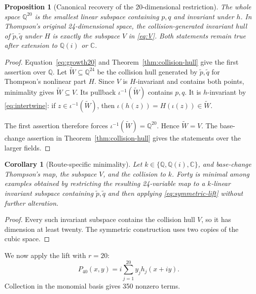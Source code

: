 \documentclass[11pt]{article}
\newtheorem{proposition}[theorem]{Proposition}
\newtheorem{corollary}[theorem]{Corollary}
\theoremstyle{remark}
\newcommand{\Q}{\mathbb{Q}}
\newcommand{\C}{\mathbb{C}}
\begin{document}
\begin{proposition}[Canonical recovery of the 20-dimensional restriction]\label{prop:canonical20}
The whole space $\Q^{20}$ is the smallest linear subspace containing $p,q$ and invariant under $h$. In Thompson's original 24-dimensional space, the collision-generated invariant hull of $\widetilde p,\widetilde q$ under $H$ is exactly the subspace $V$ in \eqref{eq:V}. Both statements remain true after extension to $\Q(i)$ or $\C$.
\end{proposition}

\begin{proof}
Equation~\eqref{eq:growth20} and Theorem~\ref{thm:collision-hull} give the first assertion over $\Q$. Let $\widetilde W\subseteq\Q^{24}$ be the collision hull generated by $\widetilde p,\widetilde q$ for Thompson's nonlinear part $H$. Since $V$ is $H$-invariant and contains both points, minimality gives $\widetilde W\subseteq V$. Its pullback $\iota^{-1}(\widetilde W)$ contains $p,q$. It is $h$-invariant by \eqref{eq:intertwine}: if $z\in\iota^{-1}(\widetilde W)$, then $\iota(h(z))=H(\iota(z))\in\widetilde W$.

The first assertion therefore forces $\iota^{-1}(\widetilde W)=\Q^{20}$. Hence $\widetilde W=V$. The base-change assertion in Theorem~\ref{thm:collision-hull} gives the statements over the larger fields.
\end{proof}

\begin{corollary}[Route-specific minimality]\label{cor:min40}
Let $k\in\{\Q,\Q(i),\C\}$, and base-change Thompson's map, the subspace $V$, and the collision to $k$. Forty is minimal among examples obtained by restricting the resulting 24-variable map to a $k$-linear invariant subspace containing $\widetilde p,\widetilde q$ and then applying \eqref{eq:symmetric-lift} without further alteration.
\end{corollary}

\begin{proof}
Every such invariant subspace contains the collision hull $V$, so it has dimension at least twenty. The symmetric construction uses two copies of the cubic space.
\end{proof}

We now apply the lift with $r=20$:
\begin{equation}\label{eq:P40}
\boxed{P_{40}(x,y)=i\sum_{j=1}^{20}y_jh_j(x+iy).}
\end{equation}
Collection in the monomial basis gives 350 nonzero terms.
\end{document}
